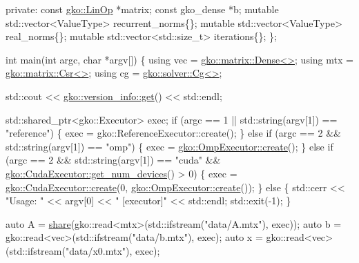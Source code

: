 \begin{DoxyCodeInclude}
\textcolor{keyword}{private}:
    \textcolor{keyword}{const} \hyperlink{classgko_1_1LinOp}{gko::LinOp} *matrix;
    \textcolor{keyword}{const} gko\_dense *b;
    \textcolor{keyword}{mutable} std::vector<ValueType> recurrent\_norms\{\};
    \textcolor{keyword}{mutable} std::vector<ValueType> real\_norms\{\};
    \textcolor{keyword}{mutable} std::vector<std::size\_t> iterations\{\};
\};


\textcolor{keywordtype}{int} main(\textcolor{keywordtype}{int} argc, \textcolor{keywordtype}{char} *argv[])
\{
    \textcolor{keyword}{using} vec = \hyperlink{classgko_1_1matrix_1_1Dense}{gko::matrix::Dense<>};
    \textcolor{keyword}{using} mtx = \hyperlink{classgko_1_1matrix_1_1Csr}{gko::matrix::Csr<>};
    \textcolor{keyword}{using} cg = \hyperlink{classgko_1_1solver_1_1Cg}{gko::solver::Cg<>};

    std::cout << \hyperlink{classgko_1_1version__info_a6daeb8a087cfb57fa055526fc133d8eb}{gko::version\_info::get}() << std::endl;

    std::shared\_ptr<gko::Executor> exec;
    \textcolor{keywordflow}{if} (argc == 1 || std::string(argv[1]) == \textcolor{stringliteral}{"reference"}) \{
        exec = gko::ReferenceExecutor::create();
    \} \textcolor{keywordflow}{else} \textcolor{keywordflow}{if} (argc == 2 && std::string(argv[1]) == \textcolor{stringliteral}{"omp"}) \{
        exec = \hyperlink{classgko_1_1OmpExecutor_a33ca05fdd0fc928ee262fc9425304874}{gko::OmpExecutor::create}();
    \} \textcolor{keywordflow}{else} \textcolor{keywordflow}{if} (argc == 2 && std::string(argv[1]) == \textcolor{stringliteral}{"cuda"} &&
               \hyperlink{classgko_1_1CudaExecutor_aef0258494d14de0e56149b920c5173e5}{gko::CudaExecutor::get\_num\_devices}() > 0) \{
        exec = \hyperlink{classgko_1_1CudaExecutor_a2718a92034350650ef406ffdb60db090}{gko::CudaExecutor::create}(0, 
      \hyperlink{classgko_1_1OmpExecutor_a33ca05fdd0fc928ee262fc9425304874}{gko::OmpExecutor::create}());
    \} \textcolor{keywordflow}{else} \{
        std::cerr << \textcolor{stringliteral}{"Usage: "} << argv[0] << \textcolor{stringliteral}{" [executor]"} << std::endl;
        std::exit(-1);
    \}

    \textcolor{keyword}{auto} A = \hyperlink{namespacegko_a3ce296f73db0ff398bdea6009a3a5c58}{share}(gko::read<mtx>(std::ifstream(\textcolor{stringliteral}{"data/A.mtx"}), exec));
    \textcolor{keyword}{auto} b = gko::read<vec>(std::ifstream(\textcolor{stringliteral}{"data/b.mtx"}), exec);
    \textcolor{keyword}{auto} x = gko::read<vec>(std::ifstream(\textcolor{stringliteral}{"data/x0.mtx"}), exec);


\end{DoxyCodeInclude}
